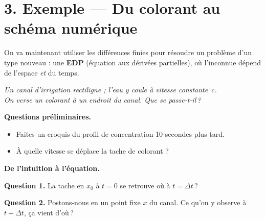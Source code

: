 \section*{3. Exemple --- Du colorant au schéma numérique}

On va maintenant utiliser les différences finies
pour résoudre un problème d'un type nouveau :
une \textbf{EDP} (équation aux dérivées partielles),
où l'inconnue dépend de l'espace \emph{et} du temps.

\medskip

\begin{center}
\begin{mdframed}[backgroundcolor=ThemeLight, linecolor=Theme,
  linewidth=1.5pt, innertopmargin=10pt, innerbottommargin=10pt]
\centering\large\itshape
\og Un canal d'irrigation rectiligne ;
l'eau y coule à vitesse constante~$c$.\\
On verse un colorant à un endroit du canal.
Que se passe-t-il\,?\fg{}
\end{mdframed}
\end{center}

\textbf{Questions préliminaires.}
\begin{itemize}[leftmargin=*]
  \item Faites un croquis du profil de concentration
        10 secondes plus tard.
  \item À quelle vitesse se déplace la tache de colorant ?
\end{itemize}

\esquisse[4cm]


\textbf{De l'intuition à l'équation.}

\smallskip

\textbf{Question 1.}
\og La tache en $x_0$ à $t=0$
se retrouve où à $t = \Delta t$\,?\fg{}


\textbf{Question 2.}
\og Postons-nous en un point fixe $x$ du canal.
Ce qu'on y observe à $t + \Delta t$,
ça vient d'où\,?\fg{}


